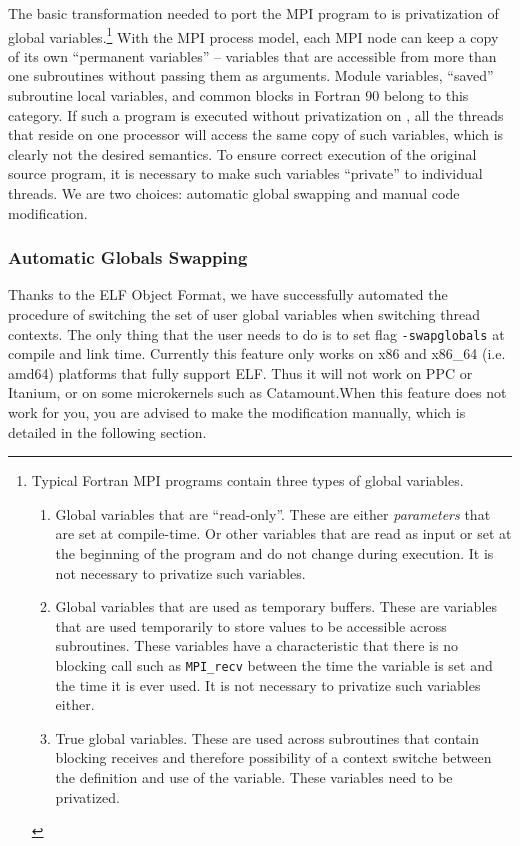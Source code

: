 \documentclass[10pt]{article}
\begin{document}
The basic transformation needed to port the MPI program to \ampi{} is
privatization of global variables.\footnote{Typical Fortran MPI programs
contain three types of global variables.

\begin{enumerate}

\item Global variables that are ``read-only''. These are either
\emph{parameters} that are set at compile-time. Or other variables that are
read as input or set at the beginning of the program and do not change during
execution. It is not necessary to privatize such variables.

\item Global variables that are used as temporary buffers. These are variables
that are used temporarily to store values to be accessible across subroutines.
These variables have a characteristic that there is no blocking call such as
\texttt{MPI\_recv} between the time the variable is set and the time it is ever
used. It is not necessary to privatize such variables either. 

\item True global variables. These are used across subroutines that contain
blocking receives and therefore possibility of a context switche between the
definition and use of the variable. These variables need to be privatized.

\end{enumerate}
}
With the MPI process model, each MPI node can keep a copy of its own
``permanent variables'' -- variables that are accessible from more than one
subroutines without passing them as arguments.  Module variables, ``saved''
subroutine local variables, and common blocks in Fortran 90 belong to this
category. If such a program is executed without privatization on \ampi{}, all
the \ampi{} threads that reside on one processor will access the same copy of
such variables, which is clearly not the desired semantics.  To ensure correct
execution of the original source program, it is necessary to make such
variables ``private'' to individual threads. We are two choices: automatic 
global swapping and manual code modification.

\subsubsection{Automatic Globals Swapping}
Thanks to the ELF Object Format, we have successfully automated the procedure 
of switching the set of user global variables when switching thread contexts. 
The only thing that the user needs to do is to set flag {\tt -swapglobals} 
at compile and link time. Currently this feature only works on x86 and x86\_64
 (i.e. amd64) platforms that fully support ELF. Thus it will not work on PPC or
  Itanium, or on some microkernels such as Catamount.When this feature does
   not work for you,
you are advised to make the modification manually, which is detailed in the
following section.
\end{document}
